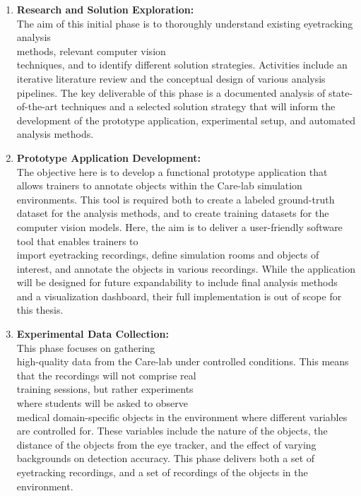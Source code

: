 \documentclass[english]{hogent-article}
\begin{document}
\begin{enumerate}
    \item \textbf{Research and Solution Exploration:}\\
    The aim of this initial phase is to thoroughly understand existing eyetracking analysis\\ methods, 
    relevant computer vision\\ techniques, and to identify different solution strategies. 
    Activities include an iterative literature review and the conceptual design of various analysis pipelines.
    The key deliverable of this phase is a documented analysis of state-of-the-art techniques and a selected solution strategy 
    that will inform the development of the prototype application, experimental setup, and automated analysis methods.
    \item \textbf{Prototype Application Development:}\\
    The objective here is to develop a functional prototype application that allows trainers to annotate objects within the Care-lab simulation environments.
    This tool is required both to create a labeled ground-truth dataset for the analysis methods, and to create training datasets for the computer vision models.
    Here, the aim is to deliver a user-friendly software tool that enables trainers to\\ import eyetracking recordings, define simulation rooms and objects of interest, and annotate the objects in various recordings.
    While the application will be designed for future expandability to include final analysis methods and a visualization dashboard, their full implementation is out of scope for this thesis.
    \item \textbf{Experimental Data Collection:}\\
    This phase focuses on gathering\\ high-quality data from the Care-lab under controlled conditions. 
    This means that the recordings will not comprise real\\ training sessions, but rather experiments\\ where students will be asked to observe\\ medical 
    domain-specific objects in the environment where different variables are controlled for.
    These variables include the nature of the objects, the distance of the objects from the eye tracker, and the effect of varying backgrounds on detection accuracy.
    This phase delivers both a set of eyetracking recordings, and a set of recordings of the objects in the environment.

\end{enumerate}
\end{document}
